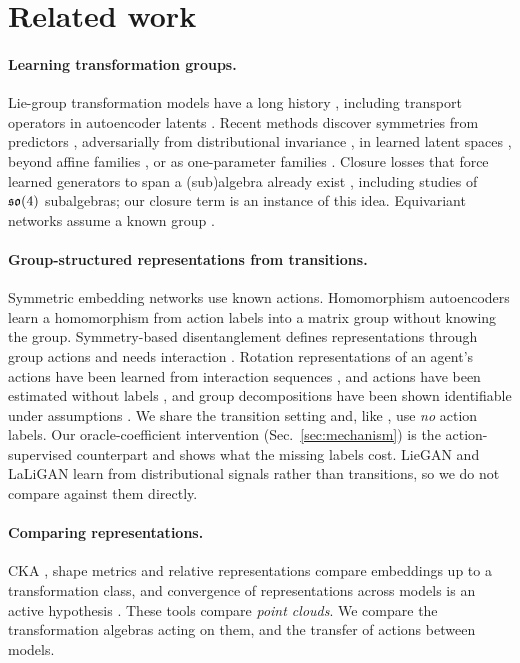 \section{Related work}\label{sec:related}
\paragraph{Learning transformation groups.}
Lie-group transformation models have a long history \citep{rao1999learning,sohl2010unsupervised,cohen2014learning},
including transport operators in autoencoder latents \citep{connor2020representing}.
Recent methods discover symmetries from predictors \citep{dehmamy2021automatic}, adversarially from distributional
invariance \citep{yang2023generative}, in learned latent spaces \citep{yang2024latent}, beyond affine families
\citep{shaw2024symmetry}, or as one-parameter families \citep{gabel2023learning}. Closure losses that force learned
generators to span a (sub)algebra already exist \citep{forestano2023deep}, including studies of $\mathfrak{so}(4)$ subalgebras;
our closure term is an instance of this idea. Equivariant networks assume a known
group \citep{cohen2016group,bronstein2021geometric}.

\paragraph{Group-structured representations from transitions.}
Symmetric embedding networks \citep{park2022learning} use known actions. Homomorphism autoencoders
\citep{keurti2023homomorphism} learn a homomorphism from action labels into a matrix group without knowing the group.
Symmetry-based disentanglement \citep{higgins2018towards} defines representations through group actions and needs
interaction \citep{casellesdupre2019symmetry}. Rotation representations of an agent's actions have been learned from interaction
sequences \citep{quessard2020learning}, and actions have been estimated without labels \citep{painter2020linear}, and group decompositions
have been shown identifiable under assumptions \citep{dangnhu2026disentangled}. We share the transition setting and,
like \citet{painter2020linear}, use \emph{no} action labels. Our oracle-coefficient intervention (Sec.~\ref{sec:mechanism})
is the action-supervised counterpart and shows what the missing labels cost. LieGAN and LaLiGAN learn from
distributional signals rather than transitions, so we do not compare against them directly.

\paragraph{Comparing representations.}
CKA \citep{kornblith2019similarity}, shape metrics \citep{williams2021generalized} and relative representations
\citep{moschella2023relative} compare embeddings up to a transformation class, and convergence of representations
across models is an active hypothesis \citep{huh2024platonic}. These tools compare \emph{point clouds}. We compare
the transformation algebras acting on them, and the transfer of actions between models.

